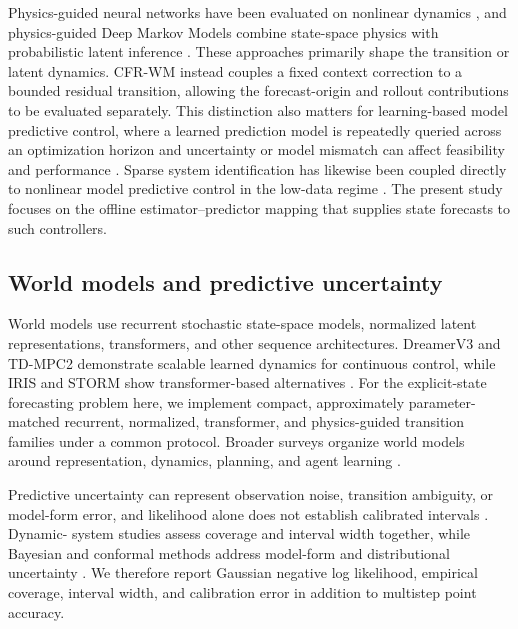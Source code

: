\documentclass[pdflatex,sn-basic]{sn-jnl}
\begin{document}
Physics-guided neural networks have been evaluated on nonlinear dynamics
\citep{robinson2022_physics_guided_neural_networks_for}, and physics-guided Deep
Markov Models combine state-space physics with probabilistic latent inference
\citep{liu2022_physics_guided_deep_markov_models}. These approaches primarily
shape the transition or latent dynamics. CFR-WM instead couples a fixed context
correction to a bounded residual transition, allowing the forecast-origin and
rollout contributions to be evaluated separately. This distinction also
matters for learning-based model predictive control, where a learned prediction
model is repeatedly queried across an optimization horizon and uncertainty or
model mismatch can affect feasibility and performance
\citep{hewing2020_learning_mpc}. Sparse system identification has likewise been
coupled directly to nonlinear model predictive control in the low-data regime
\citep{kaiser2018_sindy_mpc}. The present study focuses on the offline
estimator--predictor mapping that supplies state forecasts to such controllers.

\subsection{World models and predictive uncertainty}

World models use recurrent stochastic state-space models, normalized latent
representations, transformers, and other sequence architectures. DreamerV3 and
TD-MPC2 demonstrate scalable learned dynamics for continuous control, while
IRIS and STORM show transformer-based alternatives
\citep{hafner2025_mastering_diverse_control_tasks_through,hansen2023_td_mpc2_scalable_robust_world,micheli2022_transformers_are_sample_efficient_world,zhang2023_storm_efficient_stochastic_transformer_based}.
For the explicit-state forecasting problem here, we implement compact,
approximately parameter-matched recurrent, normalized, transformer, and
physics-guided transition families under a common protocol. Broader surveys
organize world models around representation, dynamics, planning, and agent
learning \citep{ding2025_understanding_world_or_predicting_future}.

Predictive uncertainty can represent observation noise, transition ambiguity,
or model-form error, and likelihood alone does not establish calibrated
intervals \citep{abdar2021_a_review_of_uncertainty_quantification}. Dynamic-
system studies assess coverage and interval width together, while Bayesian and
conformal methods address model-form and distributional uncertainty
\citep{klotz2022_uncertainty_estimation_with_deep_learning,ramancha2022_accounting_for_model_form_uncertainty,portela2025_conformal_prediction_for_uncertainty_quantification}.
We therefore report Gaussian negative log likelihood, empirical coverage,
interval width, and calibration error in addition to multistep point accuracy.
\end{document}
